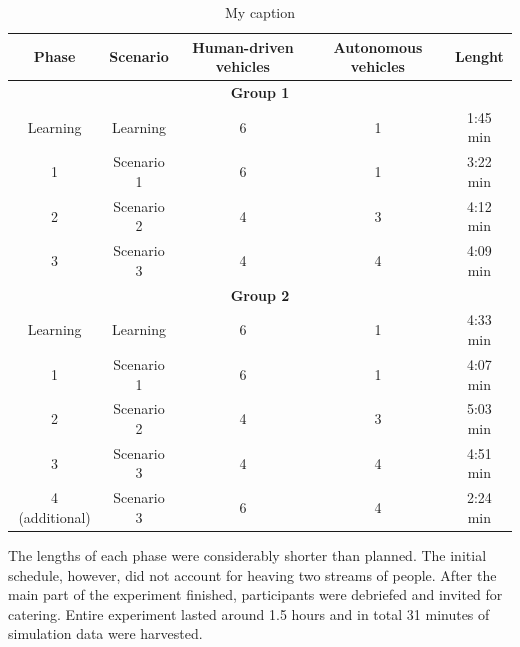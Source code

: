\documentclass[11pt,english]{article}
\begin{document}
\begin{table}[h]
\centering
\begin{tabular}{|c|c|c|c|c|}
\hline
\textbf{Phase} & \textbf{Scenario} & \textbf{Human-driven vehicles} & \textbf{Autonomous vehicles} & \textbf{Lenght} \\ \hline
\multicolumn{5}{|c|}{\textbf{Group 1}}                                                                               \\ \hline
Learning       & Learning          & 6                              & 1                            & 1:45 min        \\ \hline
1              & Scenario 1        & 6                              & 1                            & 3:22 min        \\ \hline
2              & Scenario 2        & 4                              & 3                            & 4:12 min        \\ \hline
3              & Scenario 3        & 4                              & 4                            & 4:09 min        \\ \hline
\multicolumn{5}{|c|}{\textbf{Group 2}}                                                                               \\ \hline
Learning       & Learning          & 6                              & 1                            & 4:33 min        \\ \hline
1              & Scenario 1        & 6                              & 1                            & 4:07 min        \\ \hline
2              & Scenario 2        & 4                              & 3                            & 5:03 min        \\ \hline
3              & Scenario 3        & 4                              & 4                            & 4:51 min        \\ \hline
4 (additional) & Scenario 3        & 6                              & 4                            & 2:24 min        \\ \hline
\end{tabular}
\caption{My caption}
\label{table:minutes_table}
\end{table}

The lengths of each phase were considerably shorter than planned. The initial schedule, however, did not account for heaving two streams of people. After the main part of the experiment finished, participants were debriefed and invited for catering. Entire experiment lasted around 1.5 hours and in total 31 minutes of simulation data were harvested.
\end{document}
